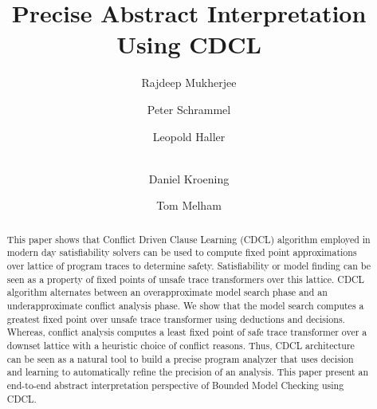\documentclass[a4paper]{llncs}
\begin{document}
\title{Precise Abstract Interpretation Using CDCL}

\author{Rajdeep Mukherjee \and Peter Schrammel \and 
Leopold Haller \and \\ 
Daniel Kroening \and Tom Melham}



\maketitle

\begin{abstract}
%
  This paper shows that Conflict Driven Clause Learning (CDCL) algorithm
  employed in modern day satisfiability solvers can be used to compute 
  fixed point approximations over lattice of program traces to determine 
  safety.  Satisfiability or model finding can be seen as a property of fixed 
  points of unsafe trace transformers over this lattice.  CDCL algorithm 
  alternates between an overapproximate model search phase and an 
  underapproximate conflict analysis phase.  We show that 
  the model search computes a greatest fixed point over unsafe trace transformer
  using deductions and decisions.  Whereas, conflict analysis computes a 
  least fixed point of safe trace transformer over a downset lattice with 
  a heuristic choice of conflict reasons.  Thus, CDCL architecture can be seen 
  as a natural tool to build a precise program analyzer that uses decision and 
  learning to automatically refine the precision of an analysis. This paper
  present an end-to-end abstract interpretation perspective of Bounded Model
  Checking using CDCL.  
%
\end{abstract}
\end{document}
